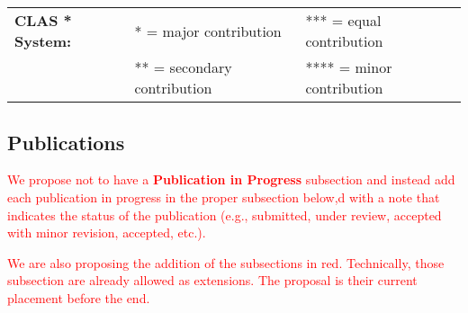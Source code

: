 \documentclass[10pt]{article}
\renewcommand{\new}[1]{\textcolor{red}{#1}}
\begin{document}
\section*{\scholarship}

\begin{IOWA ONLY}
\begin{center}
\begin{tabular}{lll}
{\bf CLAS * System:} & * = major contribution   &    *** = equal contribution \\
                     & ** = secondary contribution & **** = minor contribution
\end{tabular}
\end{center}
\end{IOWA ONLY}

\subsection*{Publications}
\smallskip

\new{We propose not to have a \textbf{Publication in Progress} subsection
and instead add each publication in progress in the proper subsection below,d 
with a note that indicates the status of the publication
(e.g., {\sf submitted}, {\sf under review}, {\sf accepted with minor revision}, {\sf accepted}, etc.).}
\medskip

\new{We are also proposing the addition of the subsections in red.
Technically, those subsection are already allowed as extensions.
The proposal is their current placement before the end.
}

\printbibliography[title={\normalsize Refereed Articles},
 type=article,
 notkeyword=nonref,
 resetnumbers=true
]

\printbibliography[title={\normalsize \new{Refereed Conference Proceedings}},
 type=inproceedings,
 notkeyword=electronic,
 resetnumbers=true
]

\printbibliography[title={\normalsize Non-Refereed Articles},
 type=article,
 keyword=nonref,
 notkeyword=abstract,
 notkeyword=electronic,
 resetnumbers=true
]

\printbibliography[title={\normalsize Books},
 filter=bookOrProc,
 notkeyword=electronic,
 resetnumbers=true
]

\printbibliography[title={\normalsize Refereed Book Chapters},
 type=incollection,
 notkeyword=nonref,
 notkeyword=electronic,
 resetnumbers=true
]
\end{document}
